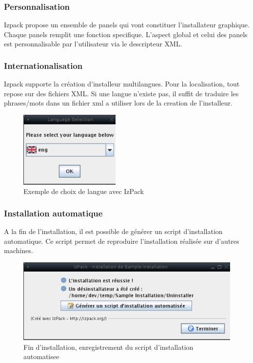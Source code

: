 \subsubsection{Personnalisation}
Izpack propose un ensemble de panels qui vont constituer l'installateur graphique. Chaque panels remplit une fonction specifique. L'aspect global et celui des panels est personnalisable par l'utilisateur via le descripteur XML.
\subsubsection{Internationalisation}
Izpack supporte la création d'installeur multilangues. Pour la localisation, tout repose sur des fichiers XML. Si une langue n'existe pas, il suffit de traduire les phrases/mots dans un fichier xml a utiliser lors de la creation de l'installeur.
\begin{figure}[H]
	\centering
	\includegraphics[width=5cm]{../image/LangChoice.png}
	\caption{Exemple de choix de langue avec IzPack}
\end{figure}
\subsubsection{Installation automatique}
A la fin de l'installation, il est possible de générer un script d'installation automatique. Ce script permet de reproduire l'installation réalisée sur d'autres machines.
\begin{figure}[H]
	\centering
	\includegraphics[width=12cm]{../image/SaveInstallXML.png}
	\caption{Fin d'installation, enregistrement du script d'installation automatisee}
\end{figure}
